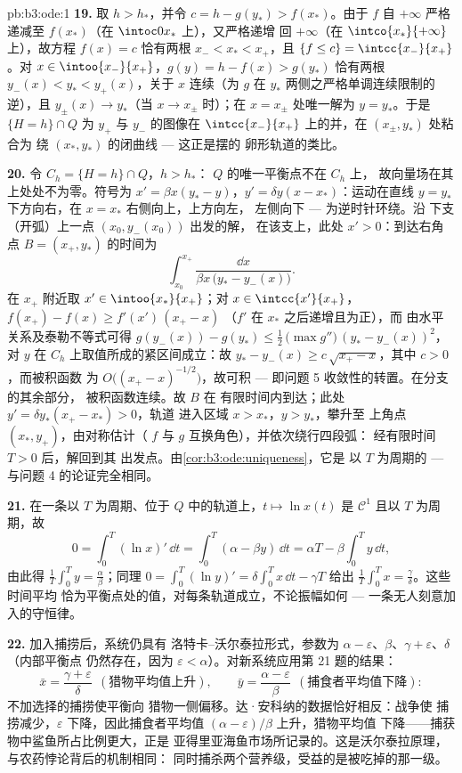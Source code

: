 \begin{solution}{pb:b3:ode:1}
\textbf{19.} 取 $h > h_*$，并令 $c = h - g(y_*) >
f(x_*)$。由于 $f$ 自 $+\infty$ 严格递减至
$f(x_*)$（在 $\intoc0{x_*}$ 上），又严格递增
回 $+\infty$（在 $\intco{x_*}{+\infty}$ 上），故方程 $f(x) = c$
恰有两根 $x_- < x_* < x_+$，且 $\{f \leq c\} =
\intcc{x_-}{x_+}$。对 $x \in \intoo{x_-}{x_+}$，$g(y) = h -
f(x) > g(y_*)$ 恰有两根 $y_-(x) < y_* <
y_+(x)$，关于 $x$ 连续（为
$g$ 在
$y_*$ 两侧之严格单调连续限制的逆），且 $y_\pm(x) \to y_*$（当 $x \to x_\pm$ 时）；在 $x =
x_\pm$ 处唯一解为 $y = y_*$。于是 $\{H = h\}\cap
Q$ 为 $y_+$ 与 $y_-$ 的图像在
$\intcc{x_-}{x_+}$ 上的并，在 $(x_\pm, y_*)$ 处粘合为
绕 $(x_*, y_*)$ 的闭曲线 --- 这正是摆的
卵形轨道的类比。

\textbf{20.} 令 $C_h = \{H = h\}\cap Q$，$h > h_*$：
$Q$ 的唯一平衡点不在 $C_h$ 上，
故向量场在其上处处不为零。符号为 $x' = \beta x(y_* - y)$，$y' =
\delta y(x - x_*)$：运动在直线 $y
= y_*$ 下方向右，在 $x = x_*$ 右侧向上，上方向左，
左侧向下 --- 为逆时针环绕。沿
下支（开弧）上一点 $(x_0, y_-(x_0))$ 出发的解，
在该支上，此处 $x' > 0$：到达右角点
$B = (x_+, y_*)$ 的时间为
\[
\int_{x_0}^{x_+}\frac{\dd x}{\beta x\,\bigl(y_* -
y_-(x)\bigr)} .
\]
在 $x_+$ 附近取 $x' \in \intoo{x_*}{x_+}$；对 $x \in
\intcc{x'}{x_+}$，$f(x_+) - f(x) \geq f'(x')\,(x_+ - x)$
（$f'$ 在 $x_*$ 之后递增且为正），而
由水平关系及泰勒不等式可得 $g(y_-(x)) -
g(y_*) \leq \frac12\,\bigl(\max g''\bigr)\,(y_* -
y_-(x))^2$，对 $y$ 在 $C_h$ 上取值所成的紧区间成立：故 $y_* -
y_-(x) \geq c\,\sqrt{x_+ - x}$，其中 $c > 0$，而被积函数
为 $O\bigl((x_+ - x)^{-1/2}\bigr)$，故可积 ---
即问题 5 收敛性的转置。在分支的其余部分，
被积函数连续。故 $B$ 在
有限时间内到达；此处 $y' = \delta y_*(x_+ - x_*) > 0$，轨道
进入区域 $x > x_*$，$y > y_*$，攀升至
上角点 $(x_*, y_+)$，由对称估计（
$f$ 与 $g$ 互换角色），并依次绕行四段弧：
经有限时间 $T > 0$ 后，解回到其
出发点。由\cref{cor:b3:ode:uniqueness}，它是
以 $T$ 为周期的 --- 与问题 4 的论证完全相同。

\textbf{21.} 在一条以 $T$ 为周期、位于 $Q$ 中的轨道上，$t \mapsto \ln
x(t)$ 是 $\mathcal C^1$ 且以 $T$ 为周期，故
\[
0 = \int_0^T(\ln x)'\,\dd t
= \int_0^T(\alpha - \beta y)\,\dd t
= \alpha T - \beta\int_0^Ty\,\dd t ,
\]
由此得 $\frac1T\int_0^Ty = \frac\alpha\beta$；同理 $0 =
\int_0^T(\ln y)' = \delta\int_0^Tx\,\dd t - \gamma T$ 给出
$\frac1T\int_0^Tx = \frac\gamma\delta$。这些时间平均
恰为平衡点处的值，对每条轨道成立，不论振幅如何
--- 一条无人刻意加入的守恒律。

\textbf{22.} 加入捕捞后，系统仍具有
洛特卡–沃尔泰拉形式，参数为 $\alpha -
\varepsilon$、$\beta$、$\gamma + \varepsilon$、$\delta$（内部平衡点
仍然存在，因为 $\varepsilon <
\alpha$）。对新系统应用第 21 题的结果：
\[
\bar x = \frac{\gamma + \varepsilon}{\delta}
\ \ (\text{猎物平均值上升}),
\qquad
\bar y = \frac{\alpha - \varepsilon}{\beta}
\ \ (\text{捕食者平均值下降}) :
\]
不加选择的捕捞使平衡向
猎物一侧偏移。达·安科纳的数据恰好相反：战争使
捕捞减少，$\varepsilon$ 下降，因此捕食者平均值
$(\alpha - \varepsilon)/\beta$ 上升，猎物平均值
下降——捕获物中鲨鱼所占比例更大，正是
亚得里亚海鱼市场所记录的。这是沃尔泰拉原理，
与农药悖论背后的机制相同：
同时捕杀两个营养级，受益的是被吃掉的那一级。


\end{solution}
